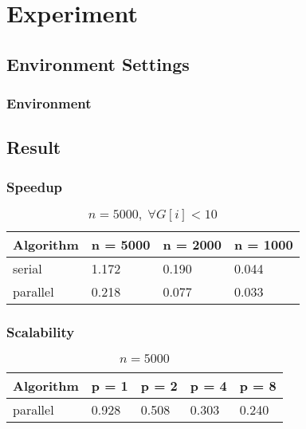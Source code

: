 \section{Experiment}

\subsection{Environment Settings}
\begin{frame}
    \frametitle{Environment}
\end{frame}

\subsection{Result}
\begin{frame}
    \frametitle{Speedup}
    \begin{table}
    	\caption{$n = 5000, \; \forall G[i] < 10$}
		\begin{tabular}{| l | l | l | l |}
			\hline
			Algorithm 		& n = 5000 & n = 2000 & n = 1000\\ \hline
			serial 			& 1.172 & 0.190 & 0.044\\ \hline
			parallel 	& 0.218 & 0.077 & 0.033\\ \hline
		\end{tabular}
	\end{table}
\end{frame}

\begin{frame}
    \frametitle{Scalability}
    \begin{table}
    	\caption{$n = 5000$}
		\begin{tabular}{| l | l | l | l | l |}
			\hline
			Algorithm 	& p = 1 & p = 2 & p = 4 & p = 8\\ \hline
			parallel 	& 0.928  & 0.508 & 0.303 & 0.240 \\ \hline
		\end{tabular}
	\end{table}
\end{frame}
